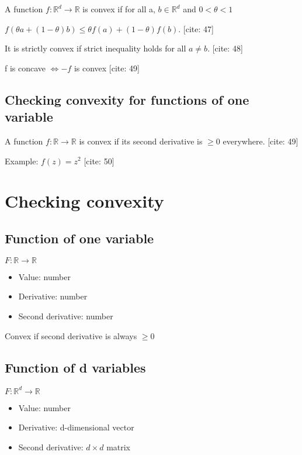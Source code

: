 \documentclass{article}
\begin{document}
A function $f:\mathbb{R}^{d}\rightarrow\mathbb{R}$ is convex if for all a, $b\in\mathbb{R}^{d}$ and $0<\theta<1$

$f(\theta a+(1-\theta)b)\le\theta f(a)+(1-\theta)f(b)$. [cite: 47]

It is strictly convex if strict inequality holds for all $a\ne b$. [cite: 48]

f is concave $\Leftrightarrow-f$ is convex [cite: 49]

\subsection{Checking convexity for functions of one variable}

A function $f:\mathbb{R}\rightarrow\mathbb{R}$ is convex if its second derivative is $\ge0$ everywhere. [cite: 49]

Example: $f(z)=z^{2}$ [cite: 50]

\section{Checking convexity}

\subsection{Function of one variable}

$F:\mathbb{R}\rightarrow\mathbb{R}$

\begin{itemize}
    \item Value: number
    \item Derivative: number
    \item Second derivative: number
\end{itemize}

Convex if second derivative is always $\ge0$

\subsection{Function of d variables}

$F:\mathbb{R}^{d}\rightarrow\mathbb{R}$

\begin{itemize}
    \item Value: number
    \item Derivative: d-dimensional vector
    \item Second derivative: $d\times d$ matrix
\end{itemize}
\end{document}
